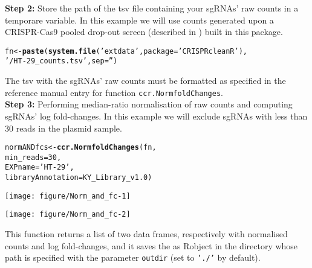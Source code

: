 \documentclass{article}\usepackage[]{graphicx}\usepackage[]{color}
\makeatletter
\def\maxwidth{ %
  \ifdim\Gin@nat@width>\linewidth
    \linewidth
  \else
    \Gin@nat@width
  \fi
}
\newcommand{\hlnum}[1]{\textcolor[rgb]{0.686,0.059,0.569}{#1}}%
\newcommand{\hlstr}[1]{\textcolor[rgb]{0.192,0.494,0.8}{#1}}%
\newcommand{\hlstd}[1]{\textcolor[rgb]{0.345,0.345,0.345}{#1}}%
\newcommand{\hlkwb}[1]{\textcolor[rgb]{0.69,0.353,0.396}{#1}}%
\newcommand{\hlkwc}[1]{\textcolor[rgb]{0.333,0.667,0.333}{#1}}%
\newcommand{\hlkwd}[1]{\textcolor[rgb]{0.737,0.353,0.396}{\textbf{#1}}}%
\newenvironment{kframe}{%
 \def\at@end@of@kframe{}%
 \ifinner\ifhmode%
  \def\at@end@of@kframe{\end{minipage}}%
  \begin{minipage}{\columnwidth}%
 \fi\fi%
 \def\FrameCommand##1{\hskip\@totalleftmargin \hskip-\fboxsep
 \colorbox{shadecolor}{##1}\hskip-\fboxsep
     \hskip-\linewidth \hskip-\@totalleftmargin \hskip\columnwidth}%
 \MakeFramed {\advance\hsize-\width
   \@totalleftmargin\z@ \linewidth\hsize
   \@setminipage}}%
 {\par\unskip\endMakeFramed%
 \at@end@of@kframe}
\newenvironment{knitrout}{}{} %
\makeatother
\begin{document}
\textbf{Step 2:} Store the path of the tsv file containing your sgRNAs' raw counts in a temporare variable. In this example we will use counts generated upon a CRISPR-Cas9 pooled drop-out screen (described in \cite{Iorio:2017}) built in this package.
\begin{knitrout}
\color{fgcolor}\begin{kframe}
\begin{alltt}
\hlstd{fn}\hlkwb{<-}\hlkwd{paste}\hlstd{(}\hlkwd{system.file}\hlstd{(}\hlstr{'extdata'}\hlstd{,}\hlkwc{package} \hlstd{=} \hlstr{'CRISPRcleanR'}\hlstd{),}
          \hlstr{'/HT-29_counts.tsv'}\hlstd{,}\hlkwc{sep}\hlstd{=}\hlstr{''}\hlstd{)}
\end{alltt}
\end{kframe}
\end{knitrout}
The tsv with the sgRNAs' raw counts must be formatted as specified in the reference manual entry for function \texttt{ccr.NormfoldChanges}.\\

\textbf{Step 3:} Performing median-ratio normalisation of raw counts and computing sgRNAs' log fold-changes.
In this example we will exclude sgRNAs with less than 30 reads in the plasmid sample.

\begin{knitrout}
\color{fgcolor}\begin{kframe}
\begin{alltt}
\hlstd{normANDfcs}\hlkwb{<-}\hlkwd{ccr.NormfoldChanges}\hlstd{(fn,}
                                \hlkwc{min_reads}\hlstd{=}\hlnum{30}\hlstd{,}
                                \hlkwc{EXPname}\hlstd{=}\hlstr{'HT-29'}\hlstd{,}
                                \hlkwc{libraryAnnotation}\hlstd{=KY_Library_v1.0)}
\end{alltt}
\end{kframe}
\texttt{[image: figure/Norm\_and\_fc-1]} 

\texttt{[image: figure/Norm\_and\_fc-2]} 

\end{knitrout}
This function returns a list of two data frames, respectively with normalised counts and log fold-changes, and it saves the as Robject in the directory whose path is specified with the parameter \texttt{outdir} (set to \texttt{'./'} by default).
\end{document}
